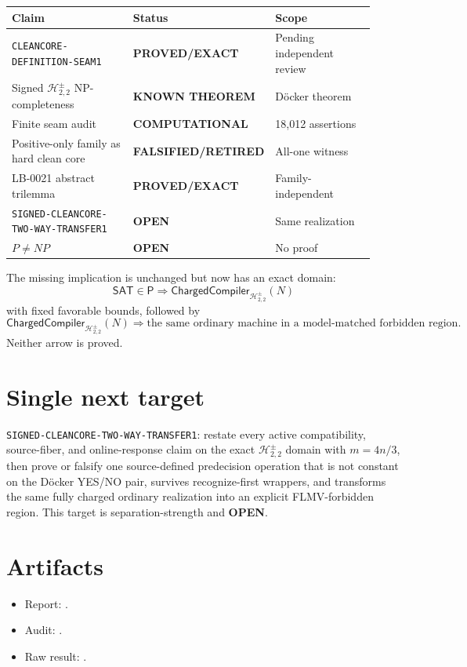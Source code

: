 \documentclass[11pt]{article}
\newcommand{\SAT}{\mathsf{SAT}}
\newcommand{\Hsigned}{\mathcal H^{\pm}_{2,2}}
\newcommand{\EXACT}{\textbf{PROVED/EXACT}}
\newcommand{\KNOWN}{\textbf{KNOWN THEOREM}}
\newcommand{\COMP}{\textbf{COMPUTATIONAL}}
\newcommand{\OPEN}{\textbf{OPEN}}
\newcommand{\RETIRED}{\textbf{FALSIFIED/RETIRED}}
\begin{document}
\begin{center}\scriptsize
\begin{tabular}{@{}p{0.39\linewidth}p{0.22\linewidth}p{0.31\linewidth}@{}}
\toprule
Claim & Status & Scope\\
\midrule
\texttt{CLEANCORE-DEFINITION-SEAM1} & \EXACT & Pending independent review\\
Signed $\Hsigned$ NP-completeness & \KNOWN & D\"ocker theorem\\
Finite seam audit & \COMP & 18,012 assertions\\
Positive-only family as hard clean core & \RETIRED & All-one witness\\
LB-0021 abstract trilemma & \EXACT & Family-independent\\
\texttt{SIGNED-CLEANCORE-TWO-WAY-TRANSFER1} & \OPEN & Same realization\\
$P\ne NP$ & \OPEN & No proof\\
\bottomrule
\end{tabular}
\end{center}

The missing implication is unchanged but now has an exact domain:
\[
 \SAT\in\mathsf P
 \Longrightarrow
 \mathsf{ChargedCompiler}_{\Hsigned}(N)
\]
with fixed favorable bounds, followed by
\[
 \mathsf{ChargedCompiler}_{\Hsigned}(N)
 \Longrightarrow
 \text{the same ordinary machine in a model-matched forbidden region}.
\]
Neither arrow is proved.

\section{Single next target}

\texttt{SIGNED-CLEANCORE-TWO-WAY-TRANSFER1}: restate every active
compatibility, source-fiber, and online-response claim on the exact
$\Hsigned$ domain with $m=4n/3$, then prove or falsify one source-defined
predecision operation that is not constant on the D\"ocker YES/NO pair,
survives recognize-first wrappers, and transforms the same fully charged
ordinary realization into an explicit FLMV-forbidden region.  This target
is separation-strength and \OPEN.

\section{Artifacts}
\begin{itemize}
\item Report:
.
\item Audit:
.
\item Raw result:
.
\end{itemize}
\end{document}
